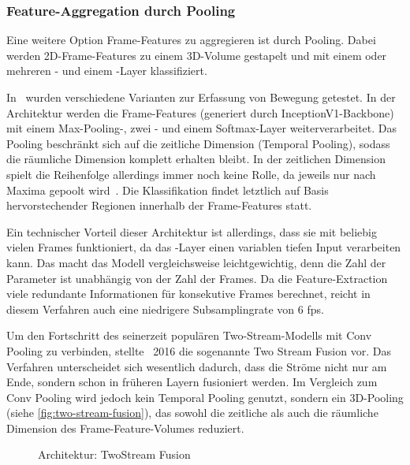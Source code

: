 \subsubsection{Feature-Aggregation durch Pooling}

Eine weitere Option Frame-Features zu aggregieren ist durch Pooling.
Dabei werden 2D-Frame-Features zu einem 3D-Volume gestapelt und mit einem oder mehreren \pool- und einem \fc-Layer klassifiziert.

In~\cite{Ng15} wurden verschiedene Varianten zur Erfassung von Bewegung getestet.
In der Architektur werden die Frame-Features (generiert durch InceptionV1-Backbone) mit einem Max-Pooling-, zwei \fc- und einem Softmax-Layer weiterverarbeitet.
Das Pooling beschränkt sich auf die zeitliche Dimension (Temporal Pooling), sodass die räumliche Dimension komplett erhalten bleibt.
In der zeitlichen Dimension spielt die Reihenfolge allerdings immer noch keine Rolle, da jeweils nur nach Maxima gepoolt wird~\cite{Carreira17}.
Die Klassifikation findet letztlich auf Basis hervorstechender Regionen innerhalb der Frame-Features statt.


Ein technischer Vorteil dieser Architektur ist allerdings, dass sie mit beliebig vielen Frames funktioniert, da das \pool-Layer einen variablen tiefen Input verarbeiten kann.
Das macht das Modell vergleichsweise leichtgewichtig, denn die Zahl der Parameter ist unabhängig von der Zahl der Frames.
Da die Feature-Extraction viele redundante Informationen für konsekutive Frames berechnet, reicht in diesem Verfahren auch eine niedrigere Subsamplingrate von 6 \gls{fps}.


Um den Fortschritt des seinerzeit populären Two-Stream-Modells mit Conv Pooling zu verbinden, stellte~\cite{Feichtenhofer16} 2016 die sogenannte Two Stream Fusion vor.
Das Verfahren unterscheidet sich wesentlich dadurch, dass die Ströme nicht nur am Ende, sondern schon in früheren Layern fusioniert werden.
Im Vergleich zum Conv Pooling wird jedoch kein Temporal Pooling genutzt, sondern ein 3D-Pooling (siehe \autoref{fig:two-stream-fusion}), das sowohl die zeitliche als auch die räumliche Dimension des Frame-Feature-Volumes reduziert.

\begin{figure}[h!]
    \centering
    \caption{Architektur: TwoStream Fusion}
    \label{fig:two-stream-fusion}
\end{figure}

